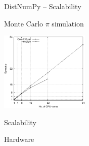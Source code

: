 \documentclass{beamer}
\begin{document}
\begin{frame}{DistNumPy -- Scalability}
\begin{center}
Monte Carlo $\pi$ simulation

\vspace{10px}
\includegraphics[width=160px]{../gfx/MonteCarloStrong}
\end{center}

\end{frame}


\begin{frame}{Scalability}
\begin{center}
Hardware\vspace{15px}


\end{center}

\end{frame}

\end{document}
